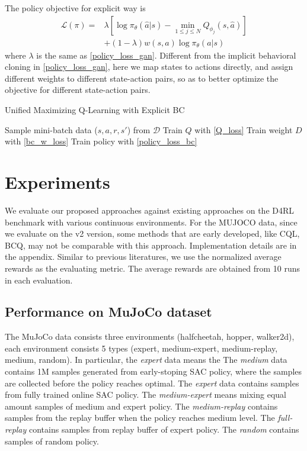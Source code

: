 \documentclass[nohyperref]{article}
\theoremstyle{plain}
\theoremstyle{definition}
\theoremstyle{remark}
\begin{document}
The policy objective for explicit way is 
\begin{equation}
\begin{aligned}
\label{policy_loss_bc}
\mathcal{L(\pi)}=& \lambda \left[\log \pi _{\theta}\left( \hat{a}|s \right) -\underset{1\le j\le N}{\min}Q_{\phi _j}(s,\hat{a}) \right] \\
                 &+ (1-\lambda) w(s,a) \log \pi_{\theta}(a|s) 
\end{aligned}
\end{equation}
where $\lambda$ is the same as \eqref{policy_loss_gan}.
Different from the implicit behavioral cloning in \eqref{policy_loss_gan}, here we map states to actions directly, and assign different weights to different state-action pairs, so as to better optimize the objective for different state-action pairs.


\begin{algorithm}[tb]
   \caption{Unified Maximizing Q-Learning with Explicit BC}
   \label{alg:ImBC}
\begin{algorithmic}
   \REPEAT
   \STATE Sample mini-batch data ($s,a,r,s\prime$) from $\mathcal{D}$
   \STATE Train $Q$ with \eqref{Q_loss}
   \STATE Train weight $D$ with \eqref{bc_w_loss}
   \STATE Train policy with \eqref{policy_loss_bc}
   \ENDFOR
\end{algorithmic}
\end{algorithm}

\section{Experiments}
We evaluate our proposed approaches against existing approaches on the D4RL benchmark\cite{d4rl} with various continuous environments. For the MUJOCO data, since we evaluate on the v2 version, some methods that are early developed, like CQL, BCQ, may not be comparable with this approach. Implementation details are in the appendix. Similar to previous literatures, we use the normalized average rewards as the evaluating metric. The average rewards are obtained from 10 runs in each evaluation. 

\subsection{Performance on MuJoCo dataset}
The MuJoCo data consists three environments (halfcheetah, hopper, walker2d), each environment consists 5 types (expert, medium-expert, medium-replay, medium, random). In particular, the \textit{expert} data means the 
The \textit{medium} data contains 1M samples generated from early-stoping SAC\cite{sac} policy, where the samples are collected before the policy reaches optimal. The \textit{expert} data contains samples from fully trained online SAC policy. The \textit{medium-expert} means mixing equal amount samples of medium and expert policy. The \textit{medium-replay} contains samples from the replay buffer when the policy reaches medium level. The \textit{full-replay} contains samples from replay buffer of expert policy. The \textit{random} contains samples of random policy.
\end{document}
